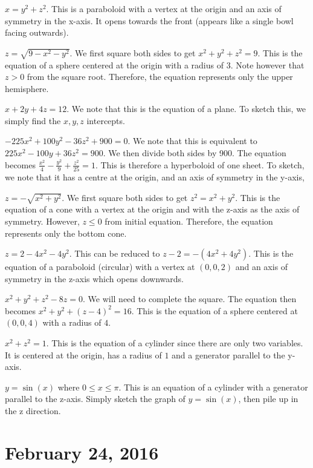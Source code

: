 \documentclass[11pt]{article}
\theoremstyle{plain} %
\theoremstyle{definition}
\theoremstyle{example}
\theoremstyle{remark}
\begin{document}
$x=y^2 + z^2$. This is a paraboloid with a vertex at the origin and an axis of symmetry in the x-axis. It opens towards the front (appears like a single bowl facing outwards).

$z = \sqrt{9-x^2-y^2}$. We first square both sides to get $x^2+y^2+z^2=9$. This is the equation of a sphere centered at the origin with a radius of 3. Note however that $z>0$ from the square root. Therefore, the equation represents only the upper hemisphere.

$x+2y+4z = 12$. We note that this is the equation of a plane. To sketch this, we simply find the $x, y, z$ intercepts.

$-225x^2+100y^2-36z^2+900=0$. We note that this is equivalent to $225x^2-100y+36z^2=900$. We then divide both sides by 900. The equation becomes $\frac{x^2}{4}-\frac{y^2}{9}+\frac{z^2}{25} = 1$. This is therefore a hyperboloid of one sheet. To sketch, we note that it has a centre at the origin, and an axis of symmetry in the y-axis, 

$z= -\sqrt{x^2+y^2}$. We first square both sides to get $z^2 = x^2 + y^2$. This is the equation of a cone with a vertex at the origin and with the z-axis as the axis of symmetry. However, $z \leq 0$ from initial equation. Therefore, the equation represents only the bottom cone. 

$z = 2-4x^2-4y^2$. This can be reduced to $z-2 = -\left(4x^2+4y^2\right)$. This is the equation of a paraboloid (circular) with a vertex at $(0,0,2)$ and an axis of symmetry in the z-axis which opens downwards. 

$x^2 + y^2 + z^2 -8z = 0$. We will need to complete the square. The equation then becomes $x^2 + y^2 +(z-4)^2 = 16$. This is the equation of a sphere centered at $(0,0,4)$ with a radius of $4$. 

$x^2+z^2=1$. This is the equation of a cylinder since there are only two variables. It is centered at the origin, has a radius of $1$ and a generator parallel to the y-axis. 

$y = \sin(x)$ where $0 \leq x \leq \pi$. This is an equation of a cylinder with a generator parallel to the z-axis. Simply sketch the graph of $y = \sin(x)$, then pile up in the z direction. 









\section{February 24, 2016}
\end{document}
